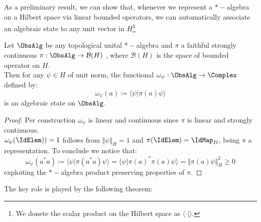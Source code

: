 \documentclass[Main]{subfiles}
\begin{document}
				As a preliminary result, we can show that, whenever we represent a $\ast-$algebra on a Hilbert space via linear bounded operators, we can automatically associate an algebraic state to any unit vector in $H$\footnote{We donete the scalar product on the Hilbert space as $\langle \cdot \vert \rangle$.}
				\begin{proposition}
					Let $\ObsAlg$ be any topological unital $\ast-$algebra and $\pi$ a faithful strongly continuous %
					$\pi: \ObsAlg \rightarrow \mathcal{B}(H)$ , where $ \mathcal{B}(H)$ is the space of bounded operator on $H$.\\
					Then for any $\psi \in H$ of unit norm, the functional $\omega_\psi : \ObsAlg \rightarrow \Complex$ defined by:
					\begin{displaymath}
						\omega_\psi ( a) \coloneqq  \langle \psi \vert \pi( a ) \psi \rangle
					\end{displaymath}
					is an algebraic state on $\ObsAlg$.
				\end{proposition}
				\begin{proof}
				Per construction $\omega_\psi$ is linear and continuous since $\pi$ is linear and strongly continuous.\\
				$\omega_\psi (\IdElem) )= 1$ follows from $\Vert \psi \Vert_H = 1$  and $\pi(\IdElem)= \IdMap_D$, being $\pi$ a representation. To conclude we notice that:
				\begin{displaymath}
					\omega_\psi ( a^* a) \coloneqq \langle \psi \vert \pi( a^* a) \psi \rangle = \langle \psi | \pi(a)^* \pi(a) \psi \rangle = \Vert \pi(a)\psi \Vert^2_H \geq 0
				\end{displaymath}
					exploiting the $\ast-$algebra product preserving properties of $\pi$.
				\end{proof}
				The key role is played by the following theorem:
\end{document}
